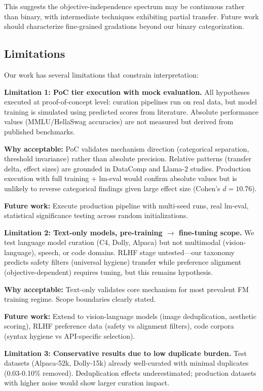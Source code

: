 This suggests the objective-independence spectrum may be continuous rather than binary, with intermediate techniques exhibiting partial transfer. Future work should characterize fine-grained gradations beyond our binary categorization.

\subsection{Limitations}

Our work has several limitations that constrain interpretation:

\textbf{Limitation 1: PoC tier execution with mock evaluation.} All hypotheses executed at proof-of-concept level: curation pipelines run on real data, but model training is simulated using predicted scores from literature. Absolute performance values (MMLU/HellaSwag accuracies) are not measured but derived from published benchmarks.

\textbf{Why acceptable:} PoC validates mechanism direction (categorical separation, threshold invariance) rather than absolute precision. Relative patterns (transfer delta, effect sizes) are grounded in DataComp and Llama-2 studies. Production execution with full training + lm-eval would confirm absolute values but is unlikely to reverse categorical findings given large effect size (Cohen's $d=10.76$).

\textbf{Future work:} Execute production pipeline with multi-seed runs, real lm-eval, statistical significance testing across random initializations.

\textbf{Limitation 2: Text-only models, pre-training $\rightarrow$ fine-tuning scope.} We test language model curation (C4, Dolly, Alpaca) but not multimodal (vision-language), speech, or code domains. RLHF stage untested—our taxonomy predicts safety filters (universal hygiene) transfer while preference alignment (objective-dependent) requires tuning, but this remains hypothesis.

\textbf{Why acceptable:} Text-only validates core mechanism for most prevalent FM training regime. Scope boundaries clearly stated.

\textbf{Future work:} Extend to vision-language models (image deduplication, aesthetic scoring), RLHF preference data (safety vs alignment filters), code corpora (syntax hygiene vs API-specific selection).

\textbf{Limitation 3: Conservative results due to low duplicate burden.} Test datasets (Alpaca-52k, Dolly-15k) already well-curated with minimal duplicates (0.03-0.10\% removed). Deduplication effects underestimated; production datasets with higher noise would show larger curation impact.

